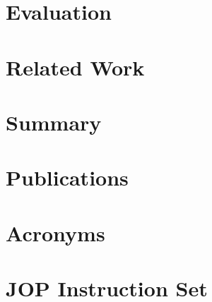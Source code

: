 %    

\chapter{Evaluation}

\label{chap:results}
    

\chapter{Related Work}
\label{chap:related}

    


\chapter{Summary}
\label{chap:conclusions}
    





\appendix
 \ihead{\leftmark} %

\chapter{Publications}
    

\chapter{Acronyms}
 \label{appx:acro}



\chapter{JOP Instruction Set} \label{appx:jop:instr}


